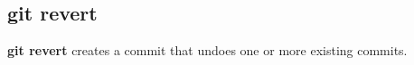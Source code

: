 %

\subsection{git revert}
\textbf{git revert} creates a commit that undoes one or more existing commits.

%